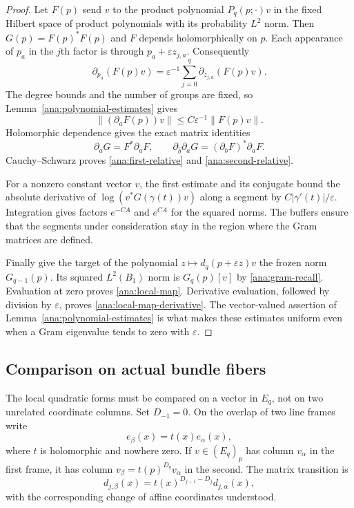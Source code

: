 \documentclass[11pt,reqno]{amsart}
\numberwithin{equation}{section}
\theoremstyle{definition}
\theoremstyle{remark}
\begin{document}
\begin{proof}
Let $F(p)$ send $v$ to the product polynomial $P_q(p;\cdot)v$ in
the fixed Hilbert space of product polynomials with its probability
$L^2$ norm.  Then $G(p)=F(p)^*F(p)$ and $F$ depends holomorphically
on $p$.  Each appearance of $p_a$ in the $j$th factor is through
$p_a+\varepsilon z_{j,a}$.  Consequently
\[
 \partial_{p_a}(F(p)v)
 =\varepsilon^{-1}\sum_{j=0}^q
 \partial_{z_{j,a}}(F(p)v).
\]
The degree bounds and the number of groups are fixed, so
Lemma~\ref{ana:polynomial-estimates} gives
\[
 \|(\partial_aF(p))v\|\leq C\varepsilon^{-1}\|F(p)v\|.
\]
Holomorphic dependence gives the exact matrix identities
\[
 \partial_aG=F^*\partial_aF,
 \qquad
 \partial_{\bar b}\partial_aG=(\partial_bF)^*\partial_aF.
\]
Cauchy--Schwarz proves \eqref{ana:first-relative} and
\eqref{ana:second-relative}.

For a nonzero constant vector $v$, the first estimate and its conjugate
bound the absolute derivative of $\log(v^*G(\gamma(t))v)$ along a
segment by $C|\gamma'(t)|/\varepsilon$.  Integration gives factors
$e^{-CA}$ and $e^{CA}$ for the squared norms.  The buffers ensure
that the segments under consideration stay in the region where the
Gram matrices are defined.

Finally give the target of the polynomial
$z\mapsto d_q(p+\varepsilon z)v$ the frozen norm $G_{q-1}(p)$.
Its squared $L^2(B_1)$ norm is $G_q(p)[v]$ by
\eqref{ana:gram-recall}.  Evaluation at zero proves
\eqref{ana:local-map}.  Derivative evaluation, followed by division
by $\varepsilon$, proves \eqref{ana:local-map-derivative}.
The vector-valued assertion of Lemma~\ref{ana:polynomial-estimates}
is what makes these estimates uniform even when a Gram eigenvalue
tends to zero with $\varepsilon$.
\end{proof}

\subsection{Comparison on actual bundle fibers}

The local quadratic forms must be compared on a vector in $E_q$, not
on two unrelated coordinate columns.  Set $D_{-1}=0$.  On the overlap
of two line frames write
\[
 e_\beta(x)=t(x)e_\alpha(x),
\]
where $t$ is holomorphic and nowhere zero.  If $v\in(E_q)_p$ has
column $v_\alpha$ in the first frame, it has column
$v_\beta=t(p)^{D_q}v_\alpha$ in the second.  The matrix transition is
\begin{equation}\label{ana:map-transition}
 d_{j,\beta}(x)=t(x)^{D_{j-1}-D_j}d_{j,\alpha}(x),
\end{equation}
with the corresponding change of affine coordinates understood.
\end{document}
